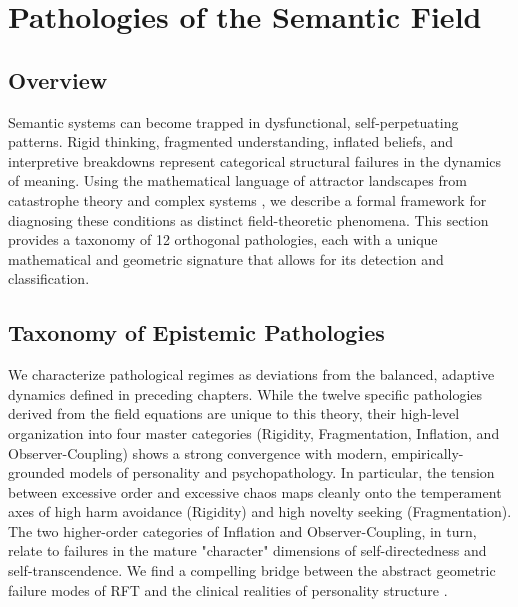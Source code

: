 \chapter{Pathologies of the Semantic Field}
\label{16:pathologies_of_the_semantic_field}


\section{Overview}

Semantic systems can become trapped in dysfunctional, self-perpetuating patterns. Rigid thinking, fragmented understanding, inflated beliefs, and interpretive breakdowns represent categorical structural failures in the dynamics of meaning. Using the mathematical language of attractor landscapes from catastrophe theory and complex systems \autocite{Thom1975, Zeeman1977, Milnor1985}, we describe a formal framework for diagnosing these conditions as distinct field-theoretic phenomena. This section provides a taxonomy of 12 orthogonal pathologies, each with a unique mathematical and geometric signature that allows for its detection and classification.


\section{Taxonomy of Epistemic Pathologies}
\label{16.1:taxonomy_of_epistemic_pathologies}

We characterize pathological regimes as deviations from the balanced, adaptive dynamics defined in preceding chapters. While the twelve specific pathologies derived from the field equations are unique to this theory, their high-level organization into four master categories (Rigidity, Fragmentation, Inflation, and Observer-Coupling) shows a strong convergence with modern, empirically-grounded models of personality and psychopathology. In particular, the tension between excessive order and excessive chaos maps cleanly onto the temperament axes of high harm avoidance (Rigidity) and high novelty seeking (Fragmentation). The two higher-order categories of Inflation and Observer-Coupling, in turn, relate to failures in the mature "character" dimensions of self-directedness and self-transcendence. We find a compelling bridge between the abstract geometric failure modes of RFT and the clinical realities of personality structure \autocite{Cloninger1993}.


